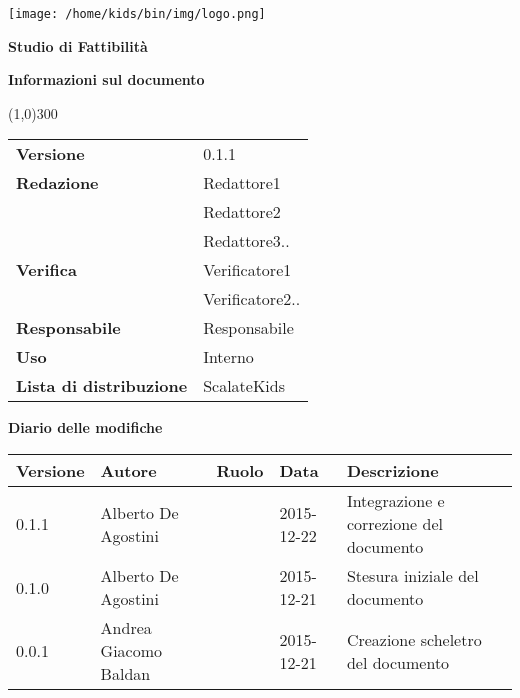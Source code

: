 \documentclass{scalatekids-article}
\begin{document}
\begin{titlepage}
  \centering
  \texttt{[image: /home/kids/bin/img/logo.png]}\par\vspace{1cm}
  \vspace{1.5cm}
         {\Huge\bfseries Studio di Fattibilità \par}
         \begin{center}
           \vspace{1.0cm}
                  {\large\bfseries Informazioni sul documento \par}
         \end{center}
         \vspace{-1cm}
         \begin{center}
           \line(1,0){300}
         \end{center}
         \vspace{0cm}
         \begin{tabular}[c]{l|l}
           \textbf{Versione} & 0.1.1\\
           \textbf{Redazione} & Redattore1\\ & Redattore2\\ & Redattore3..\\
           \textbf{Verifica} & Verificatore1\\ & Verificatore2..\\
           \textbf{Responsabile} & Responsabile\\
           \textbf{Uso} & Interno\\
           \textbf{Lista di distribuzione} & ScalateKids
         \end{tabular}
\end{titlepage}
\clearpage
\setcounter{page}{1}
\begin{flushleft}
  \vspace{0cm}
         {\large\bfseries Diario delle modifiche \par}
\end{flushleft}
\vspace{0cm}
\begin{center}
  \begin{tabular}{| l | l | l | l | l |}
    \hline
    Versione & Autore & Ruolo & Data & Descrizione \\
    \hline
    0.1.1 & Alberto De Agostini & & 2015-12-22 & Integrazione e correzione del documento\\
    \hline
    0.1.0 & Alberto De Agostini & & 2015-12-21 & Stesura iniziale del documento\\
    \hline
    0.0.1 & Andrea Giacomo Baldan & & 2015-12-21 & Creazione scheletro del documento\\
    \hline
  \end{tabular}
\end{center}
\tableofcontents
\end{document}
